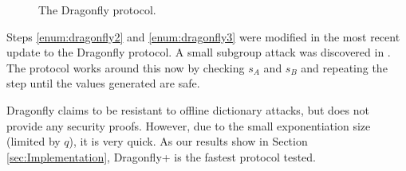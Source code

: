 \begin{figure}[h]
    \caption{The Dragonfly protocol.}
    \label{fig:dragonfly}
\end{figure}

Steps \ref{enum:dragonfly2} and \ref{enum:dragonfly3} were modified in the most recent update to the Dragonfly protocol. A small subgroup attack
was discovered in \cite{Ha2014}. The protocol works around this now by checking $s_A$ and $s_B$ and repeating the step until the values generated are safe.

Dragonfly claims to be resistant to offline dictionary attacks, but does not provide any security proofs. However, due to the small exponentiation size
(limited by $q$), it is very quick. As our results show in Section \ref{sec:Implementation}, Dragonfly+ is the fastest protocol tested.

